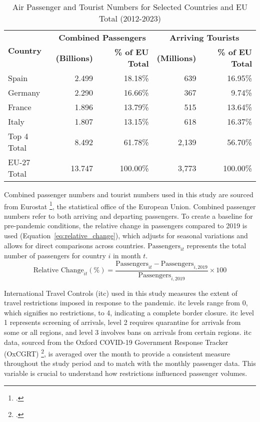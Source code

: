 \documentclass[12pt,onehalfspacing,headsepline,oneside,openright,a4paper, fleqn]{report}
\begin{document}
\begin{table}[H]
\centering
\caption{Air Passenger and Tourist Numbers for Selected Countries and EU Total (2012-2023)}
\begin{tabular}{l|rr|rr}
\toprule
\multirow{2}{*}{\textbf{Country}} & \multicolumn{2}{c|}{\textbf{Combined Passengers}} & \multicolumn{2}{c}{\textbf{Arriving Tourists}} \\
\cmidrule(lr){2-3} \cmidrule(lr){4-5}
 & \textbf{(Billions)} & \textbf{\% of EU Total} & \textbf{(Millions)} & \textbf{\% of EU Total} \\
\midrule
Spain   & 2.499 & 18.18\% & 639 & 16.95\% \\
\cmidrule(lr){1-5}
Germany & 2.290 & 16.66\% & 367 & 9.74\% \\
\cmidrule(lr){1-5}
France  & 1.896 & 13.79\% & 515 & 13.64\% \\
\cmidrule(lr){1-5}
Italy   & 1.807 & 13.15\% & 618 & 16.37\% \\
\midrule
Top 4 Total & 8.492 & 61.78\% & 2,139 & 56.70\% \\
\cmidrule(lr){1-5}
EU-27 Total & 13.747 & 100.00\% & 3,773 & 100.00\% \\
\bottomrule
\end{tabular}
\label{tab:passenger_tourist_summary_top4_eu}
\end{table}

Combined passenger numbers and tourist numbers used in this study are sourced from Eurostat \footcite{eurostat, eurostat_tourist}, the statistical office of the European Union. Combined passenger numbers refer to both arriving and departing passengers. To create a baseline for pre-pandemic conditions, the relative change in passengers compared to 2019 is used (Equation~\ref{eq:relative_change}), which adjusts for seasonal variations and allows for direct comparisons across countries. $\text{Passengers}_{it}$ represents the total number of passengers for country $i$ in month $t$.
\begin{equation}
\text{Relative Change}_{it} (\%) = \frac{\text{Passengers}_{it} - \text{Passengers}_{i,2019}}{\text{Passengers}_{i,2019}} \times 100 \label{eq:relative_change}
\end{equation}

International Travel Controls (\gls{itc}) used in this study measures the extent of travel restrictions imposed in response to the pandemic. \gls{itc} levels range from 0, which signifies no restrictions, to 4, indicating a complete border closure. \gls{itc} level 1 represents screening of arrivals, level 2 requires quarantine for arrivals from some or all regions, and level 3 involves bans on arrivals from certain regions. \gls{itc} data, sourced from the Oxford COVID-19 Government Response Tracker (OxCGRT) \footcite{itc}, is averaged over the month to provide a consistent measure throughout the study period and to match with the monthly passenger data. This variable is crucial to understand how restrictions influenced passenger volumes.
\end{document}
